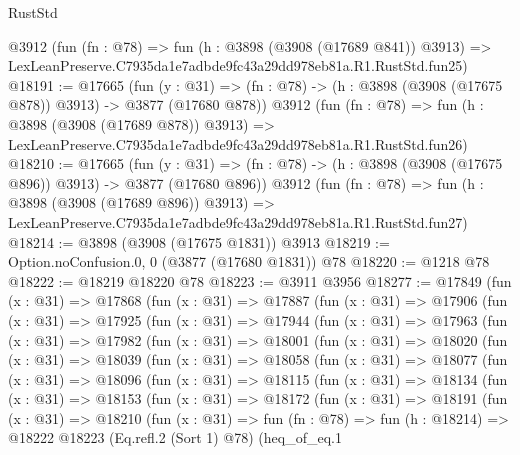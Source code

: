 \begin{lexlean}{RustStd}
\begin{coremodule}
    @3912
    (fun (fn : @78) =>
    fun (h : @3898 (@3908 (@17689 @841)) @3913) =>
    LexLeanPreserve.C7935da1e7adbde9fc43a29dd978eb81a.R1.RustStd.fun25)
@18191 := @17665
    (fun (y : @31) => (fn : @78) -> (h : @3898 (@3908 (@17675 @878)) @3913) -> @3877 (@17680 @878))
    @3912
    (fun (fn : @78) =>
    fun (h : @3898 (@3908 (@17689 @878)) @3913) =>
    LexLeanPreserve.C7935da1e7adbde9fc43a29dd978eb81a.R1.RustStd.fun26)
@18210 := @17665
    (fun (y : @31) => (fn : @78) -> (h : @3898 (@3908 (@17675 @896)) @3913) -> @3877 (@17680 @896))
    @3912
    (fun (fn : @78) =>
    fun (h : @3898 (@3908 (@17689 @896)) @3913) =>
    LexLeanPreserve.C7935da1e7adbde9fc43a29dd978eb81a.R1.RustStd.fun27)
@18214 := @3898 (@3908 (@17675 @1831)) @3913
@18219 := Option.noConfusion.{0, 0} (@3877 (@17680 @1831)) @78
@18220 := @1218 @78
@18222 := @18219 @18220 @78
@18223 := @3911 @3956
@18277 := @17849
    (fun (x : @31) =>
    @17868
      (fun (x : @31) =>
      @17887
        (fun (x : @31) =>
        @17906
          (fun (x : @31) =>
          @17925
            (fun (x : @31) =>
            @17944
              (fun (x : @31) =>
              @17963
                (fun (x : @31) =>
                @17982
                  (fun (x : @31) =>
                  @18001
                    (fun (x : @31) =>
                    @18020
                      (fun (x : @31) =>
                      @18039
                        (fun (x : @31) =>
                        @18058
                          (fun (x : @31) =>
                          @18077
                            (fun (x : @31) =>
                            @18096
                              (fun (x : @31) =>
                              @18115
                                (fun (x : @31) =>
                                @18134
                                  (fun (x : @31) =>
                                  @18153
                                    (fun (x : @31) =>
                                    @18172
                                      (fun (x : @31) =>
                                      @18191
                                        (fun (x : @31) =>
                                        @18210
                                          (fun (x : @31) =>
                                          fun (fn : @78) =>
                                          fun (h : @18214) =>
                                          @18222
                                            @18223
                                            (Eq.refl.{2} (Sort 1) @78)
                                            (heq_of_eq.{1}

\end{coremodule}
\end{lexlean}
